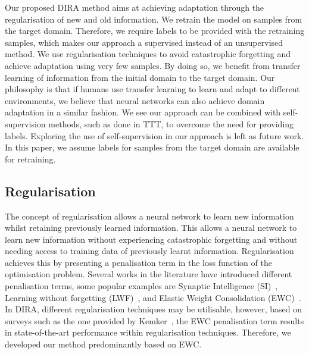 Our proposed DIRA method aims at achieving adaptation through the regularisation of new and old information.%
%
We retrain the model on samples from the target domain. %
%
Therefore, we require labels to be provided with the retraining samples, which makes our approach a supervised instead of an unsupervised method. 
%
We use regularisation techniques to avoid catastrophic forgetting and achieve adaptation using very few samples. 
%
By doing so, we benefit from transfer learning of information from the initial domain to the target domain.
%
Our philosophy is that if humans use transfer learning to learn and adapt to different environments, we believe that neural networks can also achieve domain adaptation in a similar fashion.
%
We see our approach can be combined with self-supervision methods, such as done in TTT, to overcome the need for providing labels. 
%
Exploring the use of self-supervision in our approach is left as future work. In this paper, we assume labels for samples from the target domain are available for retraining. 

\subsection{Regularisation}
The concept of regularisation allows a neural network to learn new information whilst retaining previously learned information. 
%
This allows a neural network to learn new information without experiencing catastrophic forgetting and without needing access to training data of previously learnt information.
%
Regularisation achieves this by presenting a penalisation term in the loss function of the optimisation problem. 
%
Several works in the literature have introduced different penalisation terms, some popular examples are Synaptic Intelligence (SI)~\cite{Zenke2017}, Learning without forgetting (LWF)~\cite{Li2018c}, and Elastic Weight Consolidation (EWC)~\cite{kirkpatrick2017overcoming}.  
%
In DIRA, different regularisation techniques may be utilisable, however, based on surveys such as the one provided by Kemker~\cite{Kemker2018a}, the EWC penalisation term results in state-of-the-art performance within regularisation techniques. Therefore, we developed our method predominantly based on EWC.



